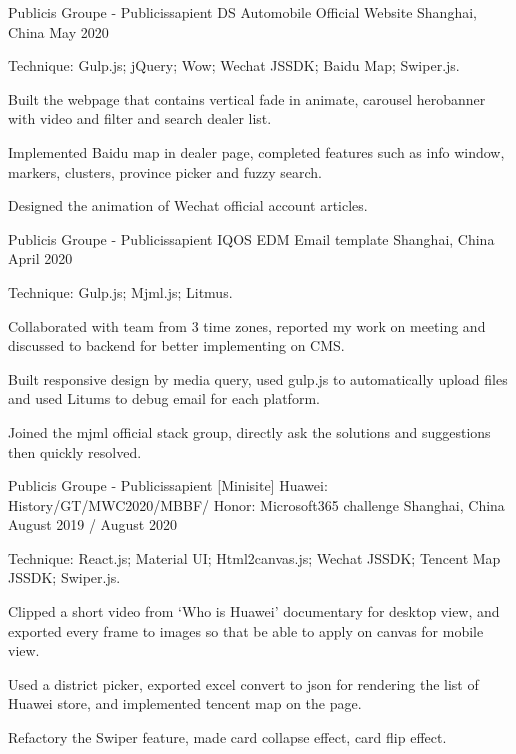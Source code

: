 \begin{cventries}
    \cventry
    {Publicis Groupe - Publicissapient} %
    {DS Automobile Official Website} %
    {Shanghai, China} %
    {May 2020} %
    {
      \begin{cvitems} %
        \item {Technique: Gulp.js; jQuery; Wow; Wechat JSSDK; Baidu Map; Swiper.js.}
        \item {Built the webpage that contains vertical fade in animate, carousel herobanner with video and filter and search dealer list.}
        \item {Implemented Baidu map in dealer page, completed features such as info window, markers, clusters, province picker and fuzzy search. }
        \item {Designed the animation of Wechat official account articles.}
      \end{cvitems}
    }
    
    
    \cventry
    {Publicis Groupe - Publicissapient} %
    {IQOS EDM Email template} %
    {Shanghai, China} %
    {April 2020} %
    {
      \begin{cvitems} %
        \item {Technique: Gulp.js; Mjml.js; Litmus.}
        \item {Collaborated with team from 3 time zones, reported my work on meeting and discussed to backend for better implementing on CMS.}
        \item {Built responsive design by media query, used gulp.js to automatically upload files and used Litums to debug email for each platform.}
        \item {Joined the mjml official stack group, directly ask the solutions and suggestions then quickly resolved.}
      \end{cvitems}
    }
    
    
    \cventry
    {Publicis Groupe - Publicissapient} %
    {[Minisite] Huawei: History/GT/MWC2020/MBBF/ Honor: Microsoft365 challenge} %
    {Shanghai, China} %
    {August 2019 / August 2020} %
    {
      \begin{cvitems} %
        \item {Technique: React.js; Material UI; Html2canvas.js; Wechat JSSDK; Tencent Map JSSDK; Swiper.js.}
        \item {Clipped a short video from ‘Who is Huawei’ documentary for desktop view, and exported every frame to images so that be able to apply on canvas for mobile view.}
        \item {Used a district picker, exported excel convert to json for rendering the list of Huawei store, and implemented tencent map on the page.}
        \item {Refactory the Swiper feature, made card collapse effect, card flip effect.}
      \end{cvitems}
    }
    

\end{cventries}
